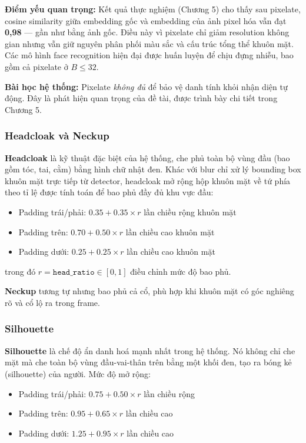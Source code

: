 \textbf{Điểm yếu quan trọng:} Kết quả thực nghiệm (Chương 5) cho thấy sau pixelate, cosine similarity giữa embedding gốc và embedding của ảnh pixel hóa vẫn đạt \textbf{0,98} --- gần như bằng ảnh gốc. Điều này vì pixelate chỉ giảm resolution không gian nhưng vẫn giữ nguyên phân phối màu sắc và cấu trúc tổng thể khuôn mặt. Các mô hình face recognition hiện đại được huấn luyện để chịu đựng nhiễu, bao gồm cả pixelate ở $B \leq 32$.

\textbf{Bài học hệ thống:} Pixelate \textit{không đủ} để bảo vệ danh tính khỏi nhận diện tự động. Đây là phát hiện quan trọng của đề tài, được trình bày chi tiết trong Chương 5.

\subsubsection{Headcloak và Neckup}
\label{subsubsec:headcloak}

\textbf{Headcloak} là kỹ thuật đặc biệt của hệ thống, che phủ toàn bộ vùng đầu (bao gồm tóc, tai, cằm) bằng hình chữ nhật đen. Khác với blur chỉ xử lý bounding box khuôn mặt trực tiếp từ detector, headcloak mở rộng hộp khuôn mặt về tứ phía theo tỉ lệ được tính toán để bao phủ đầy đủ khu vực đầu:

\begin{itemize}
    \item Padding trái/phải: $0.35 + 0.35 \times r$ lần chiều rộng khuôn mặt
    \item Padding trên: $0.70 + 0.50 \times r$ lần chiều cao khuôn mặt
    \item Padding dưới: $0.25 + 0.25 \times r$ lần chiều cao khuôn mặt
\end{itemize}

trong đó $r = \texttt{head\_ratio} \in [0, 1]$ điều chỉnh mức độ bao phủ.

\medskip
\textbf{Neckup} tương tự nhưng bao phủ cả cổ, phù hợp khi khuôn mặt có góc nghiêng rõ và cổ lộ ra trong frame.

\subsubsection{Silhouette}
\label{subsubsec:silhouette}

\textbf{Silhouette} là chế độ ẩn danh hoá mạnh nhất trong hệ thống. Nó không chỉ che mặt mà che toàn bộ vùng đầu-vai-thân trên bằng một khối đen, tạo ra bóng kẻ (silhouette) của người. Mức độ mở rộng:

\begin{itemize}
    \item Padding trái/phải: $0.75 + 0.50 \times r$ lần chiều rộng
    \item Padding trên: $0.95 + 0.65 \times r$ lần chiều cao
    \item Padding dưới: $1.25 + 0.95 \times r$ lần chiều cao
\end{itemize}

